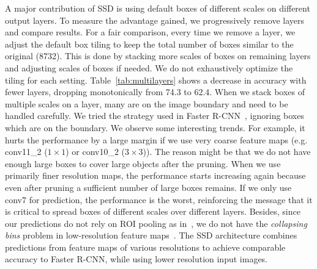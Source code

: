 \documentclass[runningheads]{llncs}
\begin{document}
 A major contribution of SSD is using default boxes of different scales on different output layers. To measure the advantage gained, we progressively remove layers and compare results. For a fair comparison, every time we remove a layer, we adjust the default box tiling to keep the total number of boxes similar to the original (8732).  This is done by stacking more scales of boxes on remaining layers and adjusting scales of boxes if needed. We do not exhaustively optimize the tiling for each setting. Table~\ref{tab:multilayers} shows a decrease in accuracy with fewer layers, dropping monotonically from 74.3 to 62.4.
When we stack boxes of multiple scales on a layer, many are on the image boundary and need to be handled carefully. We tried the strategy used in Faster R-CNN~\cite{ren2015faster}, ignoring boxes which are on the boundary. We observe some interesting trends. For example, it hurts the performance by a large margin if we use very coarse feature maps (e.g. conv11\_2 ($1\times 1$) or conv10\_2 ($3\times 3$)). The reason might be that we do not have enough large boxes to cover large objects after the pruning. When we use primarily finer resolution maps, the performance starts increasing again because even after pruning a sufficient number of large boxes remains. If we only use conv7 for prediction, the performance is the worst, reinforcing the message that it is critical to spread boxes of different scales over different layers. Besides, since our predictions do not rely on ROI pooling as in~\cite{girshick2015fast}, we do not have the \emph{collapsing bins} problem in low-resolution feature maps~\cite{zhang2016is}.  The SSD architecture combines predictions from feature maps of various resolutions to achieve comparable accuracy to Faster R-CNN, while using lower resolution input images.
\end{document}
